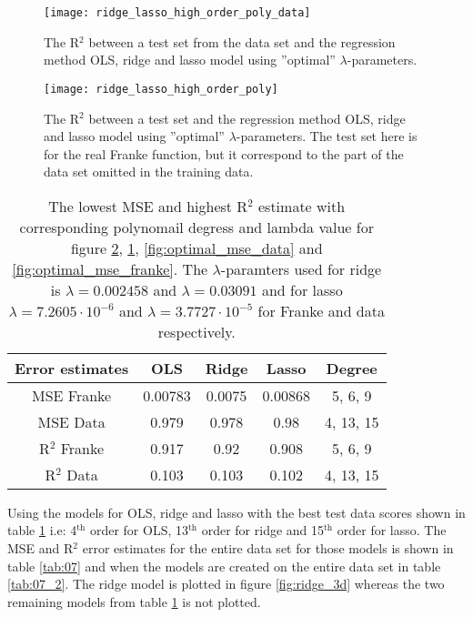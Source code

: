 \documentclass[uio,jmp,amsmath,amssymb,reprint,nofootinbib]{revtex4-1}
\numberwithin{equation}{section}
\begin{document}
\begin{figure}[H]
    \centering
    \texttt{[image: ridge\_lasso\_high\_order\_poly\_data]}
    \caption{The R\(^2\) between a test set from the data set and the regression method OLS, ridge and lasso model using ''optimal'' \(\lambda\)-parameters.}
    \label{fig:optimal_r2_franke}
\end{figure}

\begin{figure}[H]
    \centering
    \texttt{[image: ridge\_lasso\_high\_order\_poly]}
    \caption{The R\(^2\) between a test set and the regression method OLS, ridge and lasso model using ''optimal'' \(\lambda\)-parameters. The test set here is for the real Franke function, but it correspond to the part of the data set omitted in the training data.}
    \label{fig:optimal_r2_data}
\end{figure}

\begin{table}
\begin{tabular}{|c|c|c|c|c|}\hline
Error estimates & OLS & Ridge & Lasso & Degree\\ \hline
MSE Franke & 0.00783 & 0.0075 & 0.00868 & 5, 6, 9 \\ \hline
MSE Data & 0.979 & 0.978 & 0.98 & 4, 13, 15 \\ \hline
R\(^2\) Franke & 0.917 & 0.92 & 0.908 & 5, 6, 9 \\ \hline
R\(^2\) Data & 0.103 & 0.103 & 0.102 & 4, 13, 15 \\ \hline
\end{tabular}
\caption{The lowest MSE and highest R\(^2\) estimate with corresponding polynomail degress and lambda value for figure \ref{fig:optimal_r2_data}, \ref{fig:optimal_r2_franke}, \ref{fig:optimal_mse_data} and \ref{fig:optimal_mse_franke}. The \(\lambda\)-paramters used for ridge is \(\lambda = 0.002458\) and \(\lambda = 0.03091\) and for lasso \(\lambda = 7.2605\cdot 10^{-6}\) and \(\lambda = 3.7727\cdot 10^{-5}\) for Franke and data respectively.}
\label{tab:06}
\end{table}

Using the models for OLS, ridge and lasso with the best test data scores shown in table \ref{tab:06} i.e: 4\(^\text{th}\) order for OLS, 13\(^\text{th}\) order for ridge and 15\(^\text{th}\) order for lasso. The MSE and R\(^2\) error estimates for the entire data set for those models is shown in table \ref{tab:07} and when the models are created on the entire data set in table \ref{tab:07_2}. The ridge model is plotted in figure \ref{fig:ridge_3d} whereas the two remaining models from table \ref{tab:06} is not plotted.
\end{document}
